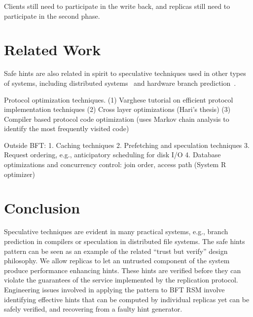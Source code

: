 \documentclass[twocolumn,10pt]{article}
\begin{document}
Clients still
need to participate in the write back, and replicas still need to participate in the
second phase. 

















































\section{Related Work}

Safe hints are also related in spirit 
to speculative techniques used in other types of systems, including
distributed systems~\cite{Speculator-sosp-05} and hardware branch
prediction~\cite{Hardware-compiler-branch}.

Protocol optimization techniques. (1) Varghese tutorial on efficient protocol implementation
techniques (2) Cross layer optimizations (Hari's thesis) (3) Compiler based protocol code
optimization (uses Markov chain analysis to identify the most frequently visited code)

Outside BFT:
1. Caching techniques
2. Prefetching and speculation techniques
3. Request ordering, e.g., anticipatory scheduling for disk I/O
4. Database optimizations and concurrency control: join order, access path (System R optimizer)

\section{Conclusion}
\label{sec:conclusion}
Speculative techniques are evident in many practical systems, e.g.,
branch prediction in compilers or speculation in distributed file
systems.  The safe hints pattern can be seen as an example of the
related ``trust but verify'' design philosophy. We allow replicas to let
an untrusted component of the system produce performance enhancing
hints.  These hints are verified before they can violate the
guarantees of the service implemented by the replication protocol.
Engineering issues involved in applying the pattern to BFT RSM involve
identifying effective hints that can be computed by individual
replicas yet can be safely verified, and recovering from a faulty hint
generator.
\end{document}
